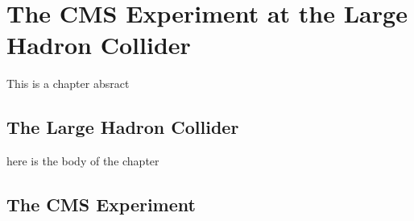 
\setcounter{secnumdepth}{3}
\setcounter{tocdepth}{3}

\setlength{\parindent}{1 em}


\makeatother


\chapter{The CMS Experiment at the Large Hadron Collider}

\begin{chapterabstract}
This is a chapter absract
\end{chapterabstract}

\section{The Large Hadron Collider}

here is the body of the chapter


\section{The CMS Experiment}


